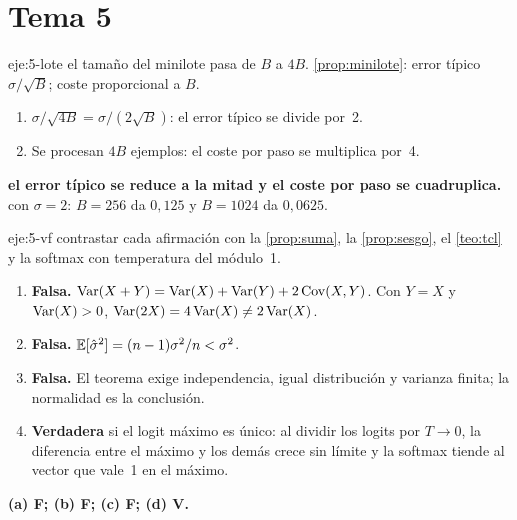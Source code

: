 \section{Tema 5}

\begin{solucion}{eje:5-lote}
\datos el tamaño del minilote pasa de $B$ a $4B$.
\planteamiento \cref{prop:minilote}: error típico $\sigma/\sqrt B$; coste proporcional a $B$.
\pasos
\begin{enumerate}[label=\arabic*.]
  \item $\sigma/\sqrt{4B}=\sigma/(2\sqrt B)$: el error típico se divide por~2.
  \item Se procesan $4B$ ejemplos: el coste por paso se multiplica por~4.
\end{enumerate}
\resultado \textbf{el error típico se reduce a la mitad y el coste por paso se cuadruplica.}
\comprobacion con $\sigma=2$: $B=256$ da $0{,}125$ y $B=1024$ da $0{,}0625$.
\end{solucion}

\begin{solucion}{eje:5-vf}
\planteamiento contrastar cada afirmación con la \cref{prop:suma}, la \cref{prop:sesgo}, el \cref{teo:tcl} y la softmax con temperatura del módulo~1.
\pasos
\begin{enumerate}[label=(\alph*)]
  \item \textbf{Falsa.} $\operatorname{Var}(X+Y)=\operatorname{Var}(X)+\operatorname{Var}(Y)+2\operatorname{Cov}(X,Y)$. Con $Y=X$ y $\operatorname{Var}(X)>0$, $\operatorname{Var}(2X)=4\operatorname{Var}(X)\ne 2\operatorname{Var}(X)$.
  \item \textbf{Falsa.} $\mathbb{E}[\hat\sigma^{2}]=(n-1)\sigma^{2}/n<\sigma^{2}$.
  \item \textbf{Falsa.} El teorema exige independencia, igual distribución y varianza finita; la normalidad es la conclusión.
  \item \textbf{Verdadera} si el logit máximo es único: al dividir los logits por $T\to 0$, la diferencia entre el máximo y los demás crece sin límite y la softmax tiende al vector que vale~1 en el máximo.
\end{enumerate}
\resultado \textbf{(a) F; (b) F; (c) F; (d) V.}
\end{solucion}

